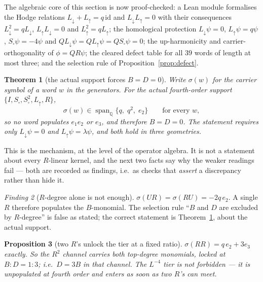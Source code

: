 \documentclass[11pt]{article}
\newtheorem{theorem}{Theorem}[section]
\newtheorem{proposition}[theorem]{Proposition}
\theoremstyle{definition}
\theoremstyle{remark}
\newtheorem{finding}[theorem]{Finding}
\newcommand{\Ldn}{L_{\downarrow}}
\newcommand{\Lup}{L_{\uparrow}}
\newcommand{\Ssq}{S_{\square}}
\newcommand{\Q}{\mathbb{Q}}
\newcommand{\chk}[1]{}
\begin{document}
The algebraic core of this section is now proof-checked: a Lean module
formalises the Hodge relations $\Ldn+\Lup=q\,\mathrm{id}$ and
$\Ldn\Lup=0$ with their consequences $\Ldn^2=q\Ldn$, $\Lup\Ldn=0$ and
$\Lup^2=q\Lup$; the homological protection $\Ldn\psi=0$, $\Lup\psi=q\psi$,
$\Ssq\psi=-4\psi$ and $Q\Ldn\psi=Q\Lup\psi=Q\Ssq\psi=0$; the up-harmonicity
and carrier-orthogonality of $\phi=QR\psi$; the cleared defect table for all
$39$ words of length at most three; and the selection rule of
Proposition~\ref{prop:defect}.\chk{for q > 0, Q projects onto ker L\_up; the cleared Hodge identities hold everywhere}

\begin{theorem}[the actual support forces $B=D=0$]\label{thm:support}
Write $\sigma(w)$ for the carrier symbol of a word $w$ in the generators. For
the actual fourth-order support $\{I,\Ssq,\Ssq^2,\Lup,R\}$,
\[
  \sigma(w)\in\operatorname{span}_{\Q}\{q,\;q^2,\;e_2\}\qquad\text{for every }w,
\]
so no word populates $e_1e_2$ or $e_3$, and therefore $B=D=0$. The statement
requires only $\Ldn\psi=0$ and $\Lup\psi=\lambda\psi$, and both hold in three
geometries.\chk{the actual fourth-order support I, U, S, S\^{}2, R forces B = D = 0}
\end{theorem}

This is the mechanism, at the level of the operator algebra. It is not a
statement about every $R$-linear kernel, and the next two facts say why the
weaker readings fail --- both are recorded as findings, i.e.\ as checks that
\emph{assert} a discrepancy rather than hide it.

\begin{finding}[$R$-degree alone is not enough]\label{find:ur}
$\sigma(UR)=\sigma(RU)=-2q\,e_2$. A single $R$ therefore populates the
$B$-monomial. The selection rule ``$B$ and $D$ are excluded by $R$-degree''
is false as stated; the correct statement is
Theorem~\ref{thm:support}, about the actual support.\chk{FINDING: one R does not exclude B; sigma(UR) = sigma(RU) = -2 q e\_2}
\end{finding}

\begin{proposition}[two $R$'s unlock the tier at a fixed ratio]\label{prop:rr}
$\sigma(RR)=q\,e_2+3e_3$ exactly. So the $R^2$ channel carries both top-degree
monomials, locked at $B:D=1:3$; i.e.\ $D=3B$ in that channel. The $L^{-4}$
tier is not forbidden --- it is unpopulated at fourth order and enters as soon
as two $R$'s can meet.\chk{two R insertions unlock the L\^{}-4 tier locked at B : D = 1 : 3}
\end{proposition}
\end{document}
